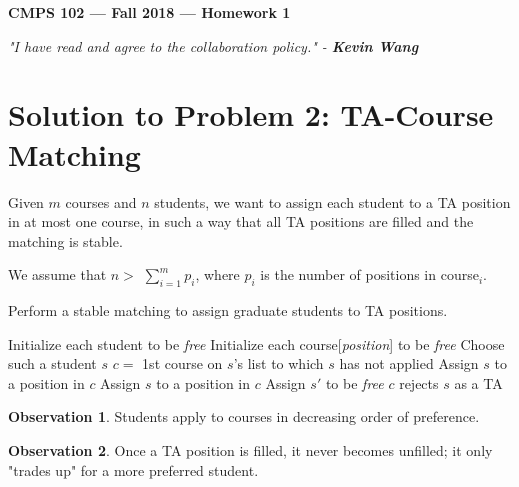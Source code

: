 \documentclass[11pt]{article}
\theoremstyle{definition}
\newtheorem{observation}{Observation}
\theoremstyle{plain}
\theoremstyle{indented-remark}
\theoremstyle{indented-proof}
\begin{document}
\begin{center}
{\bf\Large CMPS 102 --- Fall 2018 ---  Homework 1}
\end{center}

\begin{center}
\textit{"I have read and agree to the collaboration policy." - \textbf{Kevin Wang}}
\end{center}

\section*{Solution to Problem 2: TA-Course Matching}

Given $m$ courses and $n$ students, we want to assign each student to a TA position in at most one course, in such a way that all TA positions are filled and the matching is stable. \newline

\noindent We assume that $n >$ $\sum_{i=1}^{m} p_{i}$, where $p_{i}$ is the number of positions in course$_{i}$.

\begin{algorithm}
\caption{Perform a stable matching to assign graduate students to TA positions.}
\begin{algorithmic} 
\STATE Initialize each student to be \textit {free}
\STATE Initialize each course[\textit {position}] to be \textit {free}
\STATE Choose such a student $s$
\STATE $c =$ 1st course on $s$'s list to which $s$ has not applied
\STATE Assign $s$ to a position in $c$
\STATE Assign $s$ to a position in $c$
\STATE Assign $s'$ to be \textit {free}
\STATE $c$ rejects $s$ as a TA
\ENDIF
\ENDWHILE
\end{algorithmic}
\end{algorithm}

\begin{observation}
Students apply to courses in decreasing order of preference.
\end{observation}

\begin{observation}
Once a TA position is filled, it never becomes unfilled; it only "trades up" for a more preferred student.
\end{observation}
\end{document}
